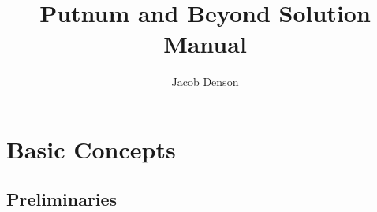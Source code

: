

\title{Putnum and Beyond Solution Manual}
\author{Jacob Denson}



\maketitle
\tableofcontents
{}

\chapter{Basic Concepts}

\section{Preliminaries}

